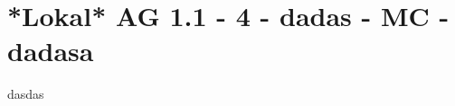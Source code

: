 \section{*Lokal* AG 1.1 - 4 - dadas - MC - dadasa}

\begin{beispiel}[AG 1.1]{1}
dasdas
\end{beispiel}